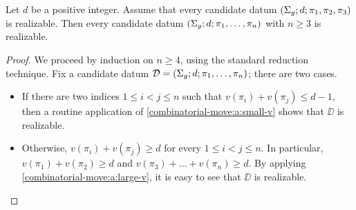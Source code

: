 \begin{proposition}\label{monodromy:th:reduction-to-n-3}
Let $d$ be a positive integer. Assume that every candidate datum $(\Sigma_{g};d;\pi_1,\pi_2,\pi_3)$ is realizable. Then every candidate datum $(\Sigma_{g};d;\pi_1,\ldots,\pi_n)$ with $n\ge 3$ is realizable.
\end{proposition}
\begin{proof}
We proceed by induction on $n\ge 4$, using the standard reduction technique. Fix a candidate datum $\mathcal{D}=(\Sigma_{g};d;\pi_1,\ldots,\pi_{n})$; there are two cases.
\begin{itemize}
\item If there are two indices $1\le i<j\le n$ such that $v(\pi_i)+v(\pi_j)\le d-1$, then a routine application of \cref{combinatorial-move:a:small-v} shows that $\DD$ is realizable.
\item Otherwise, $v(\pi_i)+v(\pi_j)\ge d$ for every $1\le i<j\le n$. In particular, $v(\pi_1)+v(\pi_2)\ge d$ and $v(\pi_3)+\ldots+v(\pi_n)\ge d$. By applying \cref{combinatorial-move:a:large-v}, it is easy to see that $\DD$ is realizable.\qedhere
\end{itemize}
\end{proof}